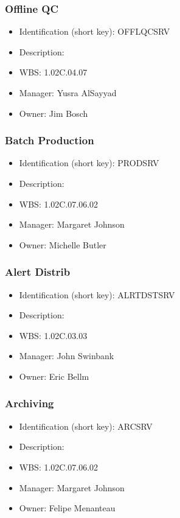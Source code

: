 \subsubsection{Offline QC}\label{sect:OFFLQCSRV}
\begin{itemize}
\item Identification (short key): OFFLQCSRV
\item Description: 
\item WBS: 1.02C.04.07
\item Manager: Yusra AlSayyad
\item Owner: Jim Bosch
\end{itemize}

\subsubsection{Batch Production}\label{sect:PRODSRV}
\begin{itemize}
\item Identification (short key): PRODSRV
\item Description: 
\item WBS: 1.02C.07.06.02
\item Manager: Margaret Johnson
\item Owner: Michelle Butler
\end{itemize}

\subsubsection{Alert Distrib}\label{sect:ALRTDSTSRV}
\begin{itemize}
\item Identification (short key): ALRTDSTSRV
\item Description: 
\item WBS: 1.02C.03.03
\item Manager: John Swinbank
\item Owner: Eric Bellm
\end{itemize}

\subsubsection{Archiving}\label{sect:ARCSRV}
\begin{itemize}
\item Identification (short key): ARCSRV
\item Description: 
\item WBS: 1.02C.07.06.02
\item Manager: Margaret Johnson
\item Owner: Felipe Menanteau
\end{itemize}

